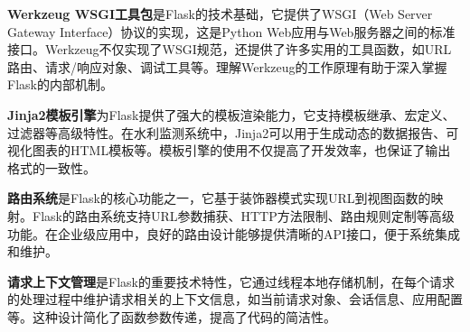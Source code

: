 \textbf{Werkzeug WSGI工具包}是Flask的技术基础，它提供了WSGI（Web Server Gateway Interface）协议的实现，这是Python Web应用与Web服务器之间的标准接口。Werkzeug不仅实现了WSGI规范，还提供了许多实用的工具函数，如URL路由、请求/响应对象、调试工具等。理解Werkzeug的工作原理有助于深入掌握Flask的内部机制。

\textbf{Jinja2模板引擎}为Flask提供了强大的模板渲染能力，它支持模板继承、宏定义、过滤器等高级特性。在水利监测系统中，Jinja2可以用于生成动态的数据报告、可视化图表的HTML模板等。模板引擎的使用不仅提高了开发效率，也保证了输出格式的一致性。

\textbf{路由系统}是Flask的核心功能之一，它基于装饰器模式实现URL到视图函数的映射。Flask的路由系统支持URL参数捕获、HTTP方法限制、路由规则定制等高级功能。在企业级应用中，良好的路由设计能够提供清晰的API接口，便于系统集成和维护。

\textbf{请求上下文管理}是Flask的重要技术特性，它通过线程本地存储机制，在每个请求的处理过程中维护请求相关的上下文信息，如当前请求对象、会话信息、应用配置等。这种设计简化了函数参数传递，提高了代码的简洁性。

